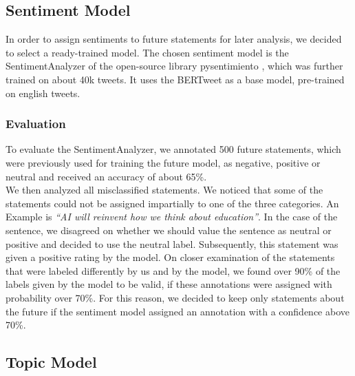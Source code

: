 \subsection{Sentiment Model}
In order to assign sentiments to future statements for later analysis, we decided to select a ready-trained model.
The chosen sentiment model is the SentimentAnalyzer of the open-source library pysentimiento \citep{perez2021pysentimiento}, which was further trained on about 40k tweets.
It uses the BERTweet \citep{bertweet} as a base model, pre-trained on english tweets.

\subsubsection{Evaluation}
To evaluate the SentimentAnalyzer, we annotated 500 future statements, which were previously used for training the future model, as negative, positive or neutral and received an accuracy of about 65\%.
\\
We then analyzed all misclassified statements.
We noticed that some of the statements could not be assigned impartially to one of the three categories.
An Example is \emph{``AI will reinvent how we think about education''}.
In the case of the sentence, we disagreed on whether we should value the sentence as neutral or positive and decided to use the neutral label.
Subsequently, this statement was given a positive rating by the model.
On closer examination of the statements that were labeled differently by us and by the model, we found over 90\% of the labels given by the model to be valid, if these annotations were assigned with probability over 70\%.
For this reason, we decided to keep only statements about the future if the sentiment model assigned an annotation with a confidence above 70\%.

\subsection{Topic Model}
\label{topic-model}
